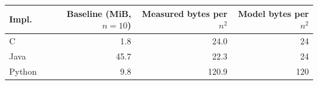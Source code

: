 \begin{tabular}{lrrr}
\toprule
Impl. & Baseline (MiB, $n{=}10$) & Measured bytes per $n^2$ & Model bytes per $n^2$ \\
\midrule
C & 1.8 & 24.0 & 24 \\
Java & 45.7 & 22.3 & 24 \\
Python & 9.8 & 120.9 & 120 \\
\bottomrule
\end{tabular}
